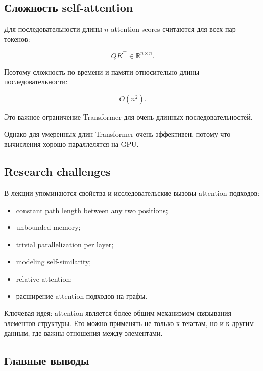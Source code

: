 \documentclass[a4paper,12pt]{article}
\begin{document}
\subsection{Сложность self-attention}

Для последовательности длины \(n\) attention scores считаются для всех пар токенов:

\[
QK^\top \in \mathbb{R}^{n \times n}.
\]

Поэтому сложность по времени и памяти относительно длины последовательности:

\[
O(n^2).
\]

Это важное ограничение Transformer для очень длинных последовательностей.

Однако для умеренных длин Transformer очень эффективен, потому что вычисления хорошо параллелятся на GPU.

\subsection{Research challenges}

В лекции упоминаются свойства и исследовательские вызовы attention-подходов:

\begin{itemize}
    \item constant path length between any two positions;
    \item unbounded memory;
    \item trivial parallelization per layer;
    \item modeling self-similarity;
    \item relative attention;
    \item расширение attention-подходов на графы.
\end{itemize}

Ключевая идея: attention является более общим механизмом связывания элементов структуры. Его можно применять не только к текстам, но и к другим данным, где важны отношения между элементами.

\subsection{Главные выводы}
\end{document}
